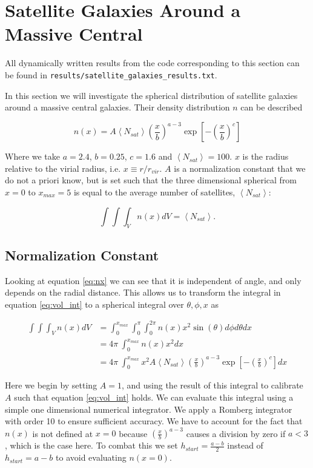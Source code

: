 \section{Satellite Galaxies Around a Massive Central}

All dynamically written results from the code corresponding to this section can be found in \texttt{results/satellite\_galaxies\_results.txt}.

In this section we will investigate the spherical distribution of satellite galaxies around a massive central galaxies. Their density distribution $n$ can be described

\begin{equation}
    n(x) = A\left<N_{sat}\right>\left(\frac{x}{b}\right)^{a-3}\exp{\left[-\left(\frac{x}{b}\right)^{c}\right]}\label{eq:nx}
\end{equation}

Where we take $a = 2.4$, $b = 0.25$, $c = 1.6$ and $\left<N_{sat}\right> = 100$. $x$ is the radius relative to the virial radius, i.e. $x \equiv r/r_{vir}$. $A$ is a normalization constant that we do not a priori know, but is set such that the three dimensional spherical from $x = 0$ to $x_{max} = 5$ is equal to the average number of satellites, $\left<N_{sat}\right>$:

\begin{equation}
    \int\int\int_V n(x)dV = \left<N_{sat}\right>.\label{eq:vol_int}
\end{equation}

\subsection{Normalization Constant}

Looking at equation \ref{eq:nx} we can see that it is independent of angle, and only depends on the radial distance. This allows us to transform the integral in equation \ref{eq:vol_int} to a spherical integral over $\theta, \phi, x$ as

\begin{align*}
    \int\int\int_V n(x)dV &= \int_0^{x_{max}} \int_0^{\pi} \int_0^{2\pi} n(x)x^2\sin(\theta) d\phi d\theta dx \\
& = 4\pi~\int_0^{x_{max}} n(x)x^2 dx \\
&= 4\pi~\int_0^{x_{max}} x^2 A\left<N_{sat}\right>\left(\frac{x}{b}\right)^{a-3}\exp{\left[-\left(\frac{x}{b}\right)^{c}\right]} dx
\end{align*}

Here we begin by setting $A = 1$, and using the result of this integral to calibrate $A$ such that equation \ref{eq:vol_int} holds. We can evaluate this integral using a simple one dimensional numerical integrator. We apply a Romberg integrator with order 10 to ensure sufficient accuracy. We have to account for the fact that $n(x)$ is not defined at $x = 0$ because $\left(\frac{x}{b}\right)^{a-3}$ causes a division by zero if $a < 3$, which is the case here. To combat this we set $h_{start} = \frac{a-b}{2}$ instead of $h_{start} = a-b$ to avoid evaluating $n(x=0)$.

